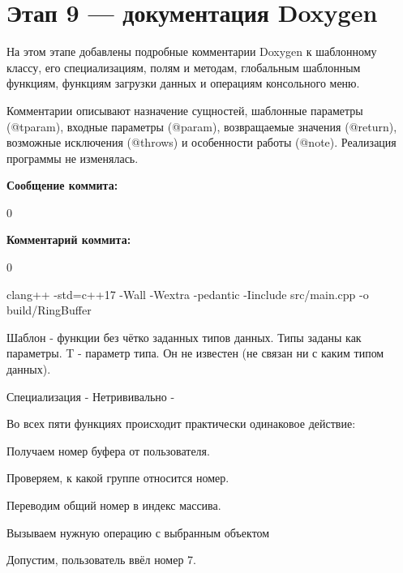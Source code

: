 \chapter{Этап 9 — документация Doxygen }
\hypertarget{md__r_e_a_d_m_e}{}\label{md__r_e_a_d_m_e}
\label{md__r_e_a_d_m_e_autotoc_md0}%
%


На этом этапе добавлены подробные комментарии Doxygen к шаблонному классу, его специализациям, полям и методам, глобальным шаблонным функциям, функциям загрузки данных и операциям консольного меню.

Комментарии описывают назначение сущностей, шаблонные параметры ({\ttfamily @tparam}), входные параметры ({\ttfamily @param}), возвращаемые значения ({\ttfamily @return}), возможные исключения ({\ttfamily @throws}) и особенности работы ({\ttfamily @note}). Реализация программы не изменялась.

{\bfseries{Сообщение коммита:}}


\begin{DoxyCode}{0}

\end{DoxyCode}


{\bfseries{Комментарий коммита:}}


\begin{DoxyCode}{0}

\end{DoxyCode}


clang++ -\/std=c++17 -\/Wall -\/Wextra -\/pedantic -\/Iinclude src/\+main.\+cpp -\/o build/\+\+Ring\+Buffer

Шаблон -\/ функции без чётко заданных типов данных. Типы заданы как параметры. T -\/ параметр типа. Он не известен (не связан ни с каким типом данных).

Специализация -\/ Нетрививально -\/

Во всех пяти функциях происходит практически одинаковое действие:
\begin{DoxyEnumerate}
\item Получаем номер буфера от пользователя.
\item Проверяем, к какой группе относится номер.
\item Переводим общий номер в индекс массива.
\item Вызываем нужную операцию с выбранным объектом
\end{DoxyEnumerate}
\begin{DoxyEnumerate}
\item Допустим, пользователь ввёл номер 7.
\end{DoxyEnumerate}

